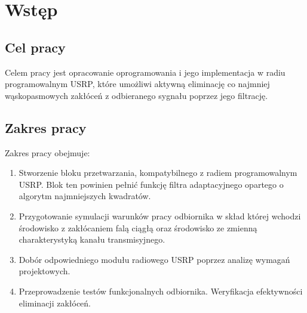 \chapter{Wstęp}
\section{Cel pracy}
Celem pracy jest opracowanie oprogramowania i jego implementacja w radiu programowalnym USRP, które umożliwi aktywną eliminację co najmniej wąskopasmowych zakłóceń z odbieranego sygnału poprzez jego filtrację.

\section{Zakres pracy}
Zakres pracy obejmuje:
\begin{enumerate}
\item Stworzenie bloku przetwarzania, kompatybilnego z radiem programowalnym USRP.
Blok ten powinien pełnić funkcję filtra adaptacyjnego opartego o algorytm najmniejszych kwadratów.
\item Przygotowanie symulacji warunków pracy odbiornika w skład której wchodzi środowisko z zakłócaniem falą ciągłą oraz środowisko ze zmienną  charakterystyką kanału transmisyjnego.
\item Dobór odpowiedniego modułu radiowego USRP poprzez analizę wymagań projektowych.
\item Przeprowadzenie testów funkcjonalnych odbiornika.
Weryfikacja efektywności eliminacji zakłóceń.
\end{enumerate} 
